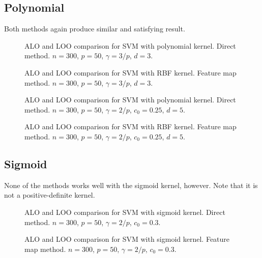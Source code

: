 \documentclass[11pt]{article}
\begin{document}
\subsection{Polynomial}
Both methods again produce similar and satisfying result.
\begin{figure}[H]
	\centering
	
	\caption{ALO and LOO comparison for SVM with polynomial kernel. Direct method. \(n=300\), \(p=50\), \(\gamma=3/p\), \(d=3\).}
\end{figure}
\begin{figure}[H]
	\centering
	
	\caption{ALO and LOO comparison for SVM with RBF kernel. Feature map method. \(n=300\), \(p=50\), \(\gamma=3/p\), \(d=3\).}
\end{figure}
\begin{figure}[H]
	\centering
	
	\caption{ALO and LOO comparison for SVM with polynomial kernel. Direct method. \(n=300\), \(p=50\), \(\gamma=2/p\), \(c_0=0.25\), \(d=5\).}
\end{figure}
\begin{figure}[H]
	\centering
	
	\caption{ALO and LOO comparison for SVM with RBF kernel. Feature map method. \(n=300\), \(p=50\), \(\gamma=2/p\), \(c_0=0.25\), \(d=5\).}
\end{figure}

\subsection{Sigmoid}
None of the methods works well with the sigmoid kernel, however. Note that it is not a positive-definite kernel.

\begin{figure}[H]
	\centering
	
	\caption{ALO and LOO comparison for SVM with sigmoid kernel. Direct method. \(n=300\), \(p=50\), \(\gamma=2/p\), \(c_0=0.3\).}
\end{figure}
\begin{figure}[H]
	\centering
	
	\caption{ALO and LOO comparison for SVM with sigmoid kernel. Feature map method. \(n=300\), \(p=50\), \(\gamma=2/p\), \(c_0=0.3\).}
\end{figure}
\end{document}
